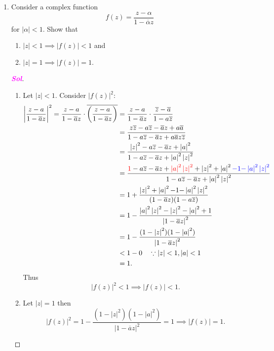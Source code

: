 \documentclass{article}
\theoremstyle{definition}
\newcommand{\of}[1]{\left( #1 \right)}
\newcommand{\abs}[1]{\left\lvert #1 \right\rvert}
\newcommand{\sol}{\textcolor{magenta}{\bf Sol}}
\newcommand{\conjugate}[1]{\overline{#1}}
\begin{document}
\begin{enumerate}
	\item Consider a complex function \[
	f\of{z}=\frac{z-\alpha}{1-\conjugate{\alpha}z}
	\] for $\abs{\alpha}<1$. Show that \begin{enumerate}
		\item $\abs{z}<1\implies\abs{f\of{z}}<1$ and
		\item $\abs{z}=1\implies\abs{f\of{z}}=1$.
	\end{enumerate}
	\begin{proof}[\sol]
		\begin{enumerate}
			\item Let $\abs{z}<1$. Consider $\abs{f\of{z}}^2$:
			\begin{align*}
				\left|\frac{z-a}{1-\conjugate{a}z}\right|^2=\frac{z-a}{1-\conjugate{a}z}\cdot\conjugate{\of{\frac{z-a}{1-\conjugate{a}z}}}&=\frac{z-a}{1-\conjugate{a}z}\cdot\frac{\conjugate{z}-\conjugate{a}}{1-a\conjugate{z}}\\
				&=\frac{z\conjugate{z}-a\conjugate{z}-\conjugate{a}z+a\conjugate{a}}{1-a\conjugate{z}-\conjugate{a}z+a\conjugate{a}z\conjugate{z}}\\
				&=\frac{\abs{z}^2-a\conjugate{z}-\conjugate{a}z+\abs{a}^2}{1-a\conjugate{z}-\conjugate{a}z+\abs{a}^2\abs{z}^2}\\
				&=\frac{\textcolor{red}{1}-a\conjugate{z}-\conjugate{a}z+\textcolor{red}{\abs{a}^2\abs{z}^2}+\abs{z}^2+\abs{a}^2\textcolor{blue}{-1}\textcolor{blue}{-\abs{a}^2\abs{z}^2}}{1-a\conjugate{z}-\conjugate{a}z+\abs{a}^2\abs{z}^2}\\
				&=1+\frac{\abs{z}^2+\abs{a}^2{-1}{-\abs{a}^2\abs{z}^2}}{(1-\conjugate{a}z)(1-a\conjugate{z})}\\
				&=1-\frac{{\abs{a}^2\abs{z}^2}-\abs{z}^2-\abs{a}^2+1}{\abs{1-\conjugate{a}z}^2}\\
				&=1-\frac{(1-\abs{z}^2)(1-\abs{a}^2)}{\abs{1-\conjugate{a}z}^2}\\
				&< 1-0\quad\because\abs{z}< 1, \abs{a}<1\\
				&=1.
			\end{align*} Thus \[
			\abs{f\of{z}}^2<1\implies\abs{f\of{z}}<1.
			\]
			
			\item Let $\abs{z}=1$ then \[
			\abs{f\of{z}}^2=1-\frac{(1-\abs{z}^2)(1-\abs{a}^2)}{\abs{1-\conjugate{a}z}^2}=1\implies\abs{f\of{z}}=1.
			\]
		\end{enumerate}
	\end{proof}
	

\end{enumerate}
\end{document}
